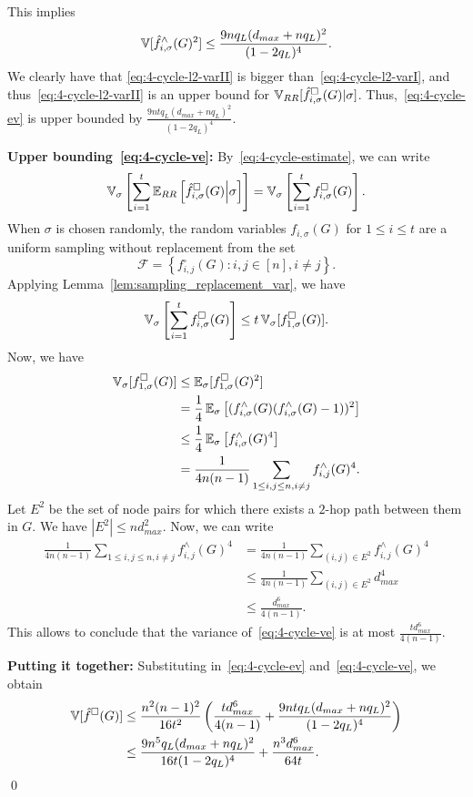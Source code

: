 This implies
\begin{equation}\label{eq:4-cycle-l2-varII}
  \operatorname{\mathbb{V}}[\hat{f}_{i,\sigma}^\wedge(G)^2] \leq
    \frac{9nq_L(d_{max} + nq_L)^2}{(1-2q_L)^4}.
\end{equation}
We clearly have that \eqref{eq:4-cycle-l2-varII} is bigger
than~\eqref{eq:4-cycle-l2-varI}, and thus~\eqref{eq:4-cycle-l2-varII} is an upper
bound for $\operatorname{\mathbb{V}}_{RR}[\hat{f}_{i,\sigma}^\square(G)|\sigma]$.
Thus,~\eqref{eq:4-cycle-ev} is upper bounded by
    $\frac{9ntq_L(d_{max} + nq_L)^2}{(1-2q_L)^4}$.

\noindent\textbf{Upper bounding~\eqref{eq:4-cycle-ve}:}
By~\eqref{eq:4-cycle-estimate}, we can write
\[
  \operatorname{\mathbb{V}}_\sigma\left[\sum_{i=1}^t \operatorname{\mathbb{E}}_{RR}\left[\hat{f}_{i,\sigma}^\square(G)\middle|
  \sigma \right]\right] = \operatorname{\mathbb{V}}_\sigma\left[\sum_{i=1}^t f_{i,\sigma}^\square(G)\right].
\]
When $\sigma$ is chosen randomly, the random variables $f_{i,\sigma}(G)$
for $1 \leq i \leq t$ are a uniform sampling without replacement from the set \[
\mathcal{F} =
\left\{f_{i,j}^\square(G): i,j \in [n], i\neq j\right\}.
\]
Applying Lemma~\ref{lem:sampling_replacement_var}, we have
\[
  \operatorname{\mathbb{V}}_\sigma\left[\sum_{i=1}^t f_{i,\sigma}^\square(G)\right]
\leq t \operatorname{\mathbb{V}}_\sigma[ f_{1,\sigma}^\square(G)].
\]
Now, we have
\begin{align*}
  \operatorname{\mathbb{V}}_{\sigma} [f_{1,\sigma}^\square(G)] &\leq
    \operatorname{\mathbb{E}}_{\sigma}[f_{1,\sigma}^\square(G)^2] \\
    &=  \frac{1}{4}\operatorname{\mathbb{E}}_{\sigma}\left[(f_{i,\sigma}^\wedge(G)(f_{i,\sigma}^\wedge(G)-1))^2\right] \\
    &\leq  \frac{1}{4}\operatorname{\mathbb{E}}_{\sigma}\left[f_{i,\sigma}^\wedge(G)^4\right] \\
    &=  \frac{1}{4n(n-1)}\sum_{1 \leq i,j \leq n, i\neq j}f_{i,j}^\wedge(G)^4.
\end{align*}
Let $E^2$ be the set of node pairs for which there exists a $2$-hop path between them in $G$. We have $|E^2| \leq nd_{max}^2$. Now, we can write
\begin{align*}
\frac{1}{4n(n-1)}\sum_{1 \leq i,j \leq n, i\neq j}f_{i,j}^\wedge(G)^4
    &= \frac{1}{4n(n-1)} \sum_{(i,j) \in E^2}f_{i,j}^\wedge(G)^4 \\
    &\leq \frac{1}{4n(n-1)} \sum_{(i,j) \in E^2} d_{max}^4 \\
    &\leq \frac{d_{max}^6}{4(n-1)}.
\end{align*}
This allows to conclude that the variance of~\eqref{eq:4-cycle-ve} is at most
$\frac{t d_{max}^6}{4(n-1)}$.

\noindent\textbf{Putting it together:}
Substituting in~\eqref{eq:4-cycle-ev} and~\eqref{eq:4-cycle-ve}, we obtain
\begin{align*}
    \operatorname{\mathbb{V}}[\hat{f}^\square(G)] &\leq
    \frac{n^2(n-1)^2}{16t^2}\left(\frac{td_{max}^6}{4(n-1)} +
    \frac{9ntq_L(d_{max} + nq_L)^2}{(1-2q_L)^4} \right) \\
    &\leq \frac{9n^5 q_L(d_{max} +
    nq_L)^2}{16t(1-2q_L)^4} + \frac{n^3d_{max}^6}{64t}.
\end{align*}\qed
